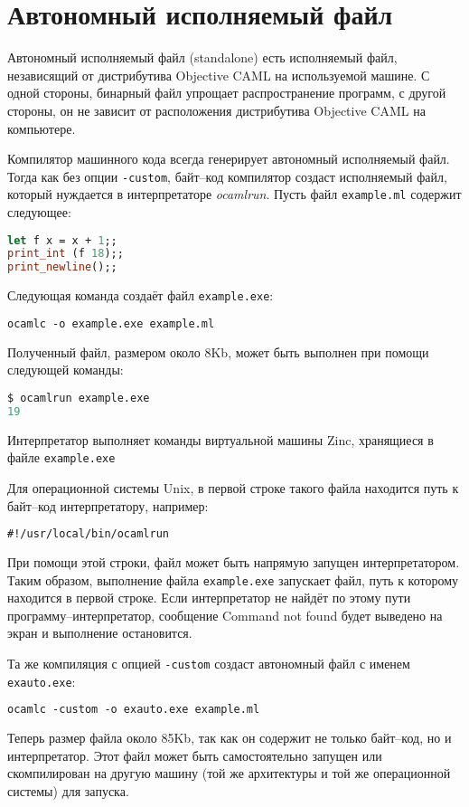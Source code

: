 \section{Автономный исполняемый файл}
\label{sec:standalone_executables}

Автономный исполняемый файл (standalone) есть исполняемый файл, независящий от
дистрибутива Objective CAML на используемой машине. С одной стороны, бинарный
файл упрощает распространение программ, с другой стороны, он не зависит от
расположения дистрибутива Objective CAML на компьютере.

Компилятор машинного кода всегда генерирует автономный исполняемый файл. Тогда
как без опции \texttt{-custom}, байт--код компилятор создаст исполняемый файл,
который нуждается в интерпретаторе {\it ocamlrun}. Пусть файл
\texttt{example.ml} содержит следующее:

\begin{lstlisting}[language=OCaml]
let f x = x + 1;;
print_int (f 18);;
print_newline();;
\end{lstlisting}

Следующая команда создаёт файл \texttt{example.exe}:

\begin{lstlisting}[language=OCaml]
ocamlc -o example.exe example.ml
\end{lstlisting}

Полученный файл, размером около 8Kb, может быть выполнен при помощи следующей
команды:

\begin{lstlisting}[language=OCaml]
$ ocamlrun example.exe
19
\end{lstlisting}

Интерпретатор выполняет команды виртуальной машины Zinc, хранящиеся в файле
\texttt{example.exe}

Для операционной системы Unix, в первой строке такого файла находится путь к
байт--код интерпретатору, например:

\begin{lstlisting}[language=OCaml]
#!/usr/local/bin/ocamlrun
\end{lstlisting}

При помощи этой строки, файл может быть напрямую запущен интерпретатором. Таким
образом, выполнение файла \texttt{example.exe} запускает файл, путь к которому
находится в первой строке. Если интерпретатор не найдёт по этому пути
программу--интерпретатор, сообщение Command not found будет выведено на экран и
выполнение остановится.

Та же компиляция с опцией \texttt{-custom} создаст автономный файл с именем
\texttt{exauto.exe}:

\begin{lstlisting}[language=OCaml]
ocamlc -custom -o exauto.exe example.ml
\end{lstlisting}

Теперь размер файла около 85Kb, так как он содержит не только байт--код, но и
интерпретатор. Этот файл может быть самостоятельно запущен или скомпилирован на
другую машину (той же архитектуры и той же операционной системы) для запуска.
